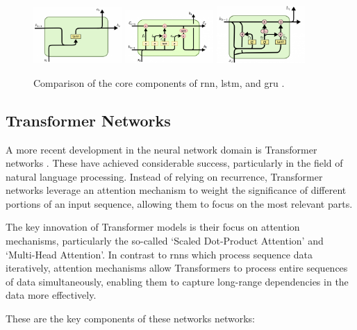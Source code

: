 \begin{figure}[H]
	\includegraphics[width=0.3\textwidth]{files/RNN_Core2-768x491.png}
	\includegraphics[width=0.3\textwidth]{files/LSTM-Core-768x466.png}
	\includegraphics[width=0.3\textwidth]{files/GRU-768x502.png}
	\caption{Comparison of the core components of \gls{rnn}, \gls{lstm}, and \gls{gru} \cite{http://dprogrammer.org}.}
\end{figure}

\subsection{Transformer Networks}

A more recent development in the neural network domain is Transformer networks
\cite{attention:2017}. These have achieved considerable success, particularly
in the field of natural language processing. Instead of relying on recurrence,
Transformer networks leverage an attention mechanism to weight the significance
of different portions of an input sequence, allowing them to focus on the most
relevant parts.

The key innovation of Transformer models is their focus on attention
mechanisms, particularly the so-called `Scaled Dot-Product Attention' and
`Multi-Head Attention'. In contrast to \glspl{rnn} which process sequence data
iteratively, attention mechanisms allow Transformers to process entire
sequences of data simultaneously, enabling them to capture long-range
dependencies in the data more effectively.

These are the key components of these networks networks:

